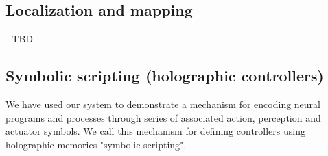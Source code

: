 \documentclass[conference]{IEEEtran}
\begin{document}
	

			
		\label{fig:visual-scene-exp}

	
	\subsection{Localization and mapping}
	- TBD
	
\subsection{Symbolic scripting (holographic controllers)}

We have used our system to demonstrate a mechanism for encoding neural programs and processes through series of associated action, perception and actuator symbols. We call this mechanism for defining controllers using holographic memories "symbolic scripting".
\end{document}
